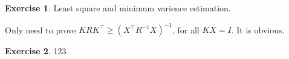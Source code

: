\documentclass[11pt,a4paper]{report}
\theoremstyle{definition}\newtheorem{exercise}{Exercise}[chapter]
\begin{document}
\begin{exercise}Least square and minimum varience estimation.\\
\end{exercise}
\begin{answer}
    Only need to prove $K RK^\top \geq (X^\top R^{-1} X)^{-1}$, for all $KX=I$. It is obvious.
\end{answer}


\begin{exercise}123\\
\end{exercise}















\end{document}
